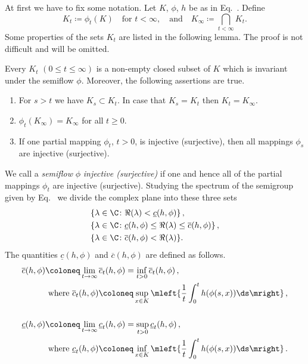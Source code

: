 At first we have to fix some notation.
Let $K$, $\phi$, $h$ be as in Eq.~. 
Define
\begin{equation}\label{eq:b3-4.2}
K_{t} \coloneq \phi_{t}(K) \quad \text{for } t < \infty,\quad\text{and}\quad K_{\infty} \coloneq \bigcap_{t < \infty} K_{t}.
\end{equation}
Some properties of the sets $K_t$  are listed in the following lemma.
The proof is not difficult and will be omitted. 
\begin{lemma}\label{lem:b3-4.2}%
Every $K_{t}$ $(0 \leq t \leq \infty)$ is a non-empty closed subset of\/ $K$ which is invariant under the semiflow $\phi$.
	Moreover, the following assertions are true.
	\begin{enumerate}[\upshape (i)]
		\item 
		For $s > t$ we have $K_{s} \subset K_{t}$.
		In case that $K_{s} = K_{t}$ then $K_{t} = K_{\infty}$.
		
		\item
		$\phi_{t}(K_{\infty}) = K_{\infty}$ for all $t \geq 0$.
		
		\item 
		If one partial mapping $\phi_{t}$, $t > 0$, is injective (surjective), then all mappings $\phi_{s}$ are injective (surjective).
	\end{enumerate}
\end{lemma}
We call a \emph{semiflow} $\phi$ \emph{injective (surjective)} if one and hence all of the partial mappings $\phi_{t}$ are injective (surjective).
Studying the spectrum of the semigroup given by Eq.~ we divide the complex plane into these three sets
\begin{equation}\label{eq:b3-4.3}
	\begin{split}	 
		&\{\lambda \in \C \colon \Re(\lambda) < \underline{c}(h,\phi)\}\,, \\
		&\{\lambda \in \C \colon \underline{c}(h,\phi) \leq \Re(\lambda) \leq \overline{c}(h,\phi)\}\,, \\
		&\{\lambda \in \C \colon \overline{c}(h,\phi) < \Re(\lambda)\}.
	\end{split}
\end{equation}
The quantities $\underline{c}(h,\phi)$ and $\overline{c}(h,\phi)$ are defined as follows.
\begin{align}\label{eq:b3-4.4}\notag
		\overline{c}(h,\phi) &\coloneq \lim_{t\to\infty} \overline{c}_{t}(h,\phi) = \inf_{t>0} \overline{c}_{t}(h,\phi)\,, \\ \notag
        &\text{ where }
		\overline{c}_{t}(h,\phi) \coloneq \sup_{x\in K} \mleft\{\frac{1}{t}\int_{0}^{t} h(\phi(s,x)) \ds \mright\}\,,\notag
        \\& \\ \notag
		\underline{c}(h,\phi) &\coloneq \lim_{t\to\infty} \underline{c}_{t}(h,\phi) = \sup_{t>0} \underline{c}_{t}(h,\phi)\,, \\ \notag
        &\text{ where } 
		\underline{c}_{t}(h,\phi) \coloneq \inf_{x\in K} \mleft\{\frac{1}{t}\int_{0}^{t} h(\phi(s,x)) \ds\mright\}\,.
\end{align}

